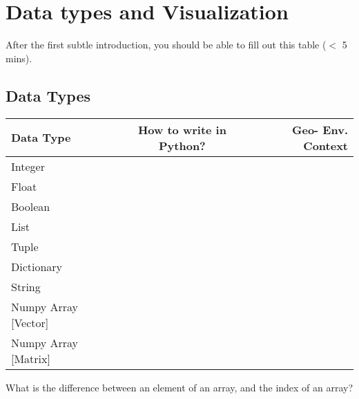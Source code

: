 
\section{Data types and Visualization}
After the first subtle introduction, you should be able to fill out this table ($<$ 5 mins).

\subsection{Data Types}

    \begin{center}
      \label{tab:table1}
      \begin{tabular}{l|c|r} %
        \textbf{Data Type} & \textbf{How to write in Python?} & \textbf{Geo- Env. Context}\\
        \hline
        Integer &  & \\
        Float &  & \\
        Boolean &  & \\
        List &  & \\
        Tuple &  & \\
        Dictionary &  & \\
        String &  & \\
        Numpy Array [Vector] &  & \\
        Numpy Array [Matrix] &  & \\
      \end{tabular}
    \end{center}
    What is the difference between an element of an array, and the index of an array?

